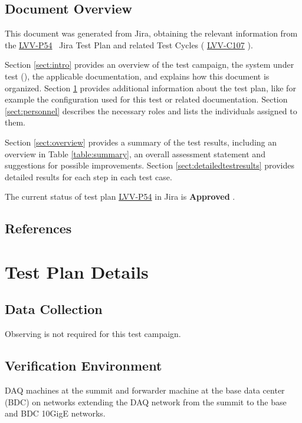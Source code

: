 \documentclass[DM,lsstdraft,STR,toc]{lsstdoc}
\begin{document}
\subsection{Document Overview}
\label{sect:docoverview}

This document was generated from Jira, obtaining the relevant information from the
\href{https://jira.lsstcorp.org/secure/Tests.jspa\#/testPlan/LVV-P54}{LVV-P54}
~Jira Test Plan and related Test Cycles (
\href{https://jira.lsstcorp.org/secure/Tests.jspa\#/testCycle/LVV-C107}{LVV-C107}
).

Section \ref{sect:intro} provides an overview of the test campaign, the system under test (\product{}),
the applicable documentation, and explains how this document is organized.
Section \ref{sect:testplan} provides additional information about the test plan, like for example the configuration
used for this test or related documentation.
Section \ref{sect:personnel} describes the necessary roles and lists the individuals assigned to them.

Section \ref{sect:overview} provides a summary of the test results, including an overview in Table \ref{table:summary},
an overall assessment statement and suggestions for possible improvements.
Section \ref{sect:detailedtestresults} provides detailed results for each step in each test case.

The current status of test plan \href{https://jira.lsstcorp.org/secure/Tests.jspa\#/testPlan/LVV-P54}{LVV-P54} in Jira is \textbf{ Approved }.

\subsection{References}
\label{sect:references}
\renewcommand{\refname}{}



\newpage
\section{Test Plan Details}
\label{sect:testplan}


\subsection{Data Collection}

  Observing is not required for this test campaign.

\subsection{Verification Environment}
\label{sect:hwconf}
  DAQ machines at the summit and forwarder machine at the base data center
(BDC) on networks extending the DAQ network from the summit to the base
and BDC 10GigE networks. ~
\end{document}
